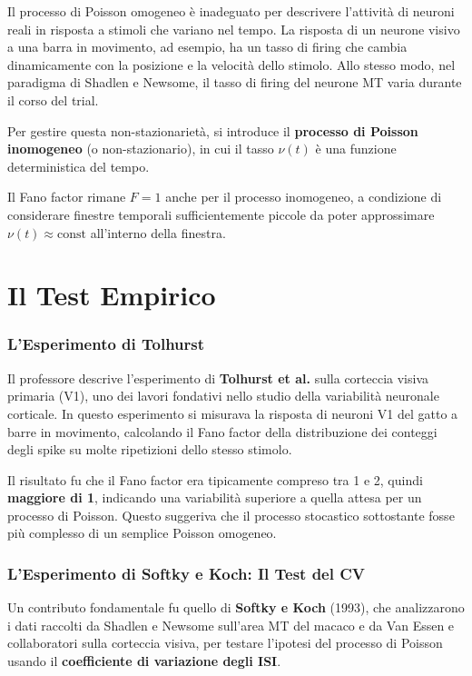 Il processo di Poisson omogeneo è inadeguato per descrivere l'attività di neuroni reali in risposta a stimoli che variano nel tempo. La risposta di un neurone visivo a una barra in movimento, ad esempio, ha un tasso di firing che cambia dinamicamente con la posizione e la velocità dello stimolo. Allo stesso modo, nel paradigma di Shadlen e Newsome, il tasso di firing del neurone MT varia durante il corso del trial.

Per gestire questa non-stazionarietà, si introduce il \textbf{processo di Poisson inomogeneo} (o non-stazionario), in cui il tasso $\nu(t)$ è una funzione deterministica del tempo.


Il Fano factor rimane $F = 1$ anche per il processo inomogeneo, a condizione di considerare finestre temporali sufficientemente piccole da poter approssimare $\nu(t) \approx \text{const}$ all'interno della finestra.


\section{Il Test Empirico}

\subsubsection{L'Esperimento di Tolhurst}

Il professore descrive l'esperimento di \textbf{Tolhurst et al.} sulla corteccia visiva primaria (V1), uno dei lavori fondativi nello studio della variabilità neuronale corticale. In questo esperimento si misurava la risposta di neuroni V1 del gatto a barre in movimento, calcolando il Fano factor della distribuzione dei conteggi degli spike su molte ripetizioni dello stesso stimolo.

Il risultato fu che il Fano factor era tipicamente compreso tra 1 e 2, quindi \textbf{maggiore di 1}, indicando una variabilità superiore a quella attesa per un processo di Poisson. Questo suggeriva che il processo stocastico sottostante fosse più complesso di un semplice Poisson omogeneo.

\subsubsection{L'Esperimento di Softky e Koch: Il Test del CV}

Un contributo fondamentale fu quello di \textbf{Softky e Koch} (1993), che analizzarono i dati raccolti da Shadlen e Newsome sull'area MT del macaco e da Van Essen e collaboratori sulla corteccia visiva, per testare l'ipotesi del processo di Poisson usando il \textbf{coefficiente di variazione degli ISI}.

